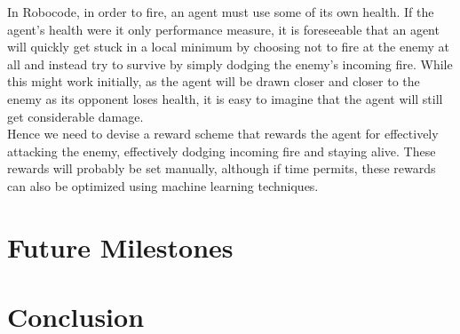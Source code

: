 \documentclass{article}
\theoremstyle{plain}
\theoremstyle{definition}
\theoremstyle{remark}
\begin{document}
In Robocode, in order to fire, an agent must use some of its own health. If the agent's health were it only performance measure, it is foreseeable that an agent will quickly get stuck in a local minimum by choosing not to fire at the enemy at all and instead try to survive by simply dodging the enemy's incoming fire. While this might work initially, as the agent will be drawn closer and closer to the enemy as its opponent loses health, it is easy to imagine that the agent will still get considerable damage.\\

Hence we need to devise a reward scheme that rewards the agent for effectively attacking the enemy, effectively dodging incoming fire and staying alive. These rewards will probably be set manually, although if time permits, these rewards can also be optimized using machine learning techniques.

\section{Future Milestones}

\section{Conclusion}



\end{document}
